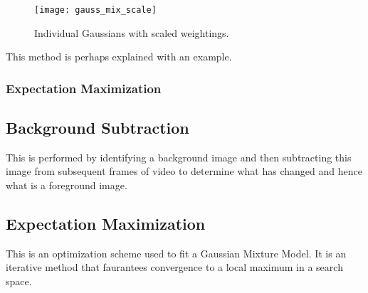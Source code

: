\begin{figure}[H]
    \centering
    \centering\texttt{[image: gauss\_mix\_scale]}
    \caption{Individual Gaussians with scaled weightings.}
    \label{fig:histScale}
  \end{figure} 

This method is perhaps explained with an example. 




\subsubsection{Expectation Maximization}






\subsection{Background Subtraction}

This is performed by identifying a background image and then subtracting this image from subsequent frames of video to determine what has changed and hence what is a foreground image.

\subsection{Expectation Maximization}

This is an optimization scheme used to fit a Gaussian Mixture Model. It is an iterative method that faurantees convergence to a local maximum in a search space.